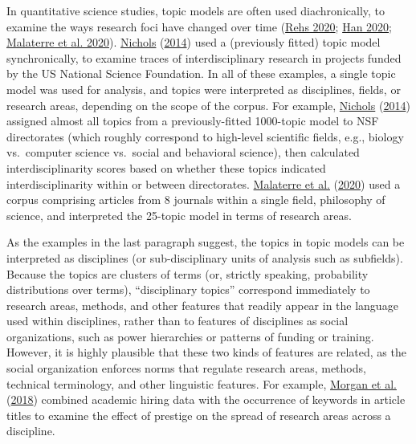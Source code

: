 \documentclass[
  11pt,
]{article}
\begin{document}
In quantitative science studies, topic models are often used diachronically, to examine the ways research foci have changed over time (\protect\hyperlink{ref-RehsStructuralTopicModel2020}{Rehs 2020}; \protect\hyperlink{ref-HanEvolutionResearchTopics2020}{Han 2020}; \protect\hyperlink{ref-MalaterreEightJournalsEight2020}{Malaterre et al. 2020}). \protect\hyperlink{ref-NicholsTopicModelApproach2014}{Nichols} (\protect\hyperlink{ref-NicholsTopicModelApproach2014}{2014}) used a (previously fitted) topic model synchronically, to examine traces of interdisciplinary research in projects funded by the US National Science Foundation. In all of these examples, a single topic model was used for analysis, and topics were interpreted as disciplines, fields, or research areas, depending on the scope of the corpus. For example, \protect\hyperlink{ref-NicholsTopicModelApproach2014}{Nichols} (\protect\hyperlink{ref-NicholsTopicModelApproach2014}{2014}) assigned almost all topics from a previously-fitted 1000-topic model to NSF directorates (which roughly correspond to high-level scientific fields, e.g., biology vs.~computer science vs.~social and behavioral science), then calculated interdisciplinarity scores based on whether these topics indicated interdisciplinarity within or between directorates. \protect\hyperlink{ref-MalaterreEightJournalsEight2020}{Malaterre et al.} (\protect\hyperlink{ref-MalaterreEightJournalsEight2020}{2020}) used a corpus comprising articles from 8 journals within a single field, philosophy of science, and interpreted the 25-topic model in terms of research areas.

As the examples in the last paragraph suggest, the topics in topic models can be interpreted as disciplines (or sub-disciplinary units of analysis such as subfields). Because the topics are clusters of terms (or, strictly speaking, probability distributions over terms), ``disciplinary topics'' correspond immediately to research areas, methods, and other features that readily appear in the language used within disciplines, rather than to features of disciplines as social organizations, such as power hierarchies or patterns of funding or training. However, it is highly plausible that these two kinds of features are related, as the social organization enforces norms that regulate research areas, methods, technical terminology, and other linguistic features. For example, \protect\hyperlink{ref-MorganPrestigeDrivesEpistemic2018}{Morgan et al.} (\protect\hyperlink{ref-MorganPrestigeDrivesEpistemic2018}{2018}) combined academic hiring data with the occurrence of keywords in article titles to examine the effect of prestige on the spread of research areas across a discipline.
\end{document}
